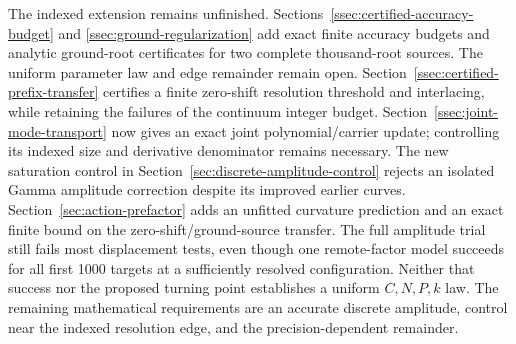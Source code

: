 \documentclass[11pt,a4paper]{article}
\begin{document}
The indexed extension remains unfinished. Sections~\ref{ssec:certified-accuracy-budget} and
\ref{ssec:ground-regularization} add exact finite accuracy budgets and
analytic ground-root certificates for two complete thousand-root sources.
The uniform parameter law and edge remainder remain open. Section~\ref{ssec:certified-prefix-transfer} certifies
a finite zero-shift resolution threshold and interlacing, while retaining
the failures of the continuum integer budget. Section~\ref{ssec:joint-mode-transport} now gives
an exact joint polynomial/carrier update; controlling its indexed size
and derivative denominator remains necessary. The new saturation control in
Section~\ref{sec:discrete-amplitude-control} rejects an isolated Gamma
amplitude correction despite its improved earlier curves. Section~\ref{sec:action-prefactor}
adds an unfitted curvature prediction and an exact finite bound on the
zero-shift/ground-source transfer. The full amplitude trial still fails
most displacement tests, even though one remote-factor model succeeds
for all first 1000 targets at a sufficiently resolved configuration.
Neither that success nor the proposed turning point establishes a
uniform $C,N,P,k$ law. The remaining mathematical requirements are an
accurate discrete amplitude, control near the indexed resolution edge,
and the precision-dependent remainder.
\end{document}
